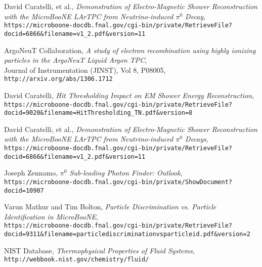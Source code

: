 \begin{thebibliography}{20}


  David Caratelli, et al., \emph{Demonstration of Electro-Magnetic Shower Reconstruction with the MicroBooNE LArTPC from Neutrino-induced $\pi^0$ Decay},\\
\texttt{https://microboone-docdb.fnal.gov/cgi-bin/private/RetrieveFile?docid=6866\&filename=v1\_2.pdf\&version=11}
  
  ArgoNeuT Collaboration, \emph{A study of electron recombination using highly ionizing particles in the ArgoNeuT Liquid Argon TPC},\\
  Journal of Instrumentation (JINST), Vol 8, P08005, \texttt{http://arxiv.org/abs/1306.1712}
  
  David Caratelli, \emph{Hit Thresholding Impact on EM Shower Energy Reconstruction},\\
  \texttt{https://microboone-docdb.fnal.gov/cgi-bin/private/RetrieveFile?docid=9020\&filename=HitThresholding\_TN.pdf\&version=8}

  David Caratelli, et al., \emph{Demonstration of Electro-Magnetic Shower Reconstruction with
the MicroBooNE LArTPC from Neutrino-induced $\pi^0$ Decays},\\
  \texttt{https://microboone-docdb.fnal.gov/cgi-bin/private/RetrieveFile?docid=6866\&filename=v1\_2.pdf\&version=11}
  
  Joseph Zennamo, \emph{$\pi^0$ Sub-leading Photon Finder: Outlook},\\
  \texttt{https://microboone-docdb.fnal.gov/cgi-bin/private/ShowDocument?docid=10907}
 
  
  Varun Mathur and Tim Bolton, \emph{Particle Discrimination vs. Particle Identification in MicroBooNE},\\
  \texttt{https://microboone-docdb.fnal.gov/cgi-bin/private/RetrieveFile?docid=9311\&filename=particlediscriminationvsparticleid.pdf\&version=2}

 NIST Database, \emph{Thermophysical Properties of Fluid Systems},\\
  \texttt{http://webbook.nist.gov/chemistry/fluid/}


\end{thebibliography}

